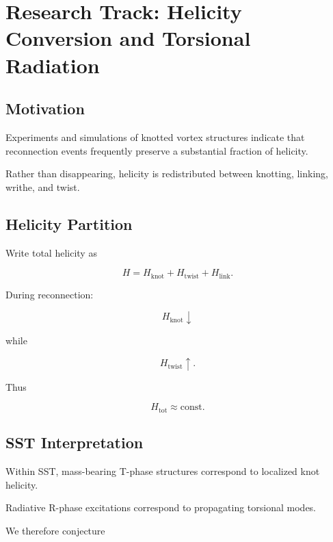     
    \section{Research Track: Helicity Conversion and Torsional Radiation}
    
    \subsection{Motivation}
        
        Experiments and simulations of knotted vortex structures indicate that
        reconnection events frequently preserve a substantial fraction of helicity.
        
        Rather than disappearing, helicity is redistributed between knotting,
        linking, writhe, and twist.
    
    \subsection{Helicity Partition}
        
        Write total helicity as
        
        \[
            H
            =
            H_{\mathrm{knot}}
            +
            H_{\mathrm{twist}}
            +
            H_{\mathrm{link}}.
        \]
        
        During reconnection:
        
        \[
            H_{\mathrm{knot}}
            \downarrow
        \]
        
        while
        
        \[
            H_{\mathrm{twist}}
            \uparrow .
        \]
        
        Thus
        
        \[
            H_{\mathrm{tot}}
            \approx
            \mathrm{const}.
        \]
    
    \subsection{SST Interpretation}
        
        Within SST, mass-bearing T-phase structures correspond to localized knot
        helicity.
        
        Radiative R-phase excitations correspond to propagating torsional modes.
        
        We therefore conjecture
        

